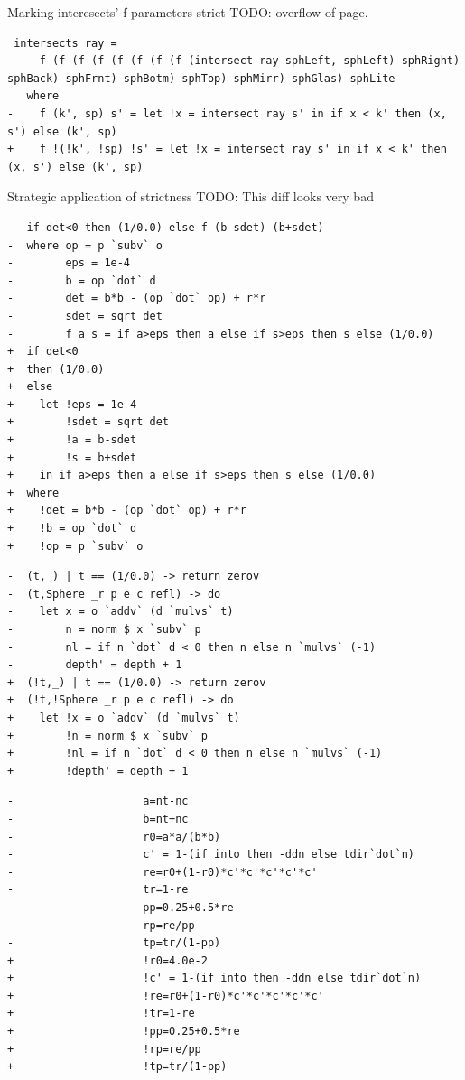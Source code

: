 \documentclass[8pt]{beamer}
\begin{document}
\begin{frame}[fragile]{Marking interesects' f parameters strict}
TODO: overflow of page.
\begin{verbatim}
 intersects ray =
     f (f (f (f (f (f (f (f (intersect ray sphLeft, sphLeft) sphRight) sphBack) sphFrnt) sphBotm) sphTop) sphMirr) sphGlas) sphLite
   where
-    f (k', sp) s' = let !x = intersect ray s' in if x < k' then (x, s') else (k', sp)
+    f !(!k', !sp) !s' = let !x = intersect ray s' in if x < k' then (x, s') else (k', sp)
\end{verbatim}
\end{frame}


\begin{frame}[fragile]{Strategic application of strictness}
TODO: This diff looks very bad
\begin{verbatim}
-  if det<0 then (1/0.0) else f (b-sdet) (b+sdet)
-  where op = p `subv` o
-        eps = 1e-4
-        b = op `dot` d
-        det = b*b - (op `dot` op) + r*r
-        sdet = sqrt det
-        f a s = if a>eps then a else if s>eps then s else (1/0.0)
+  if det<0
+  then (1/0.0)
+  else
+    let !eps = 1e-4
+        !sdet = sqrt det
+        !a = b-sdet
+        !s = b+sdet
+    in if a>eps then a else if s>eps then s else (1/0.0)
+  where
+    !det = b*b - (op `dot` op) + r*r
+    !b = op `dot` d
+    !op = p `subv` o
\end{verbatim}

\begin{verbatim}
-  (t,_) | t == (1/0.0) -> return zerov
-  (t,Sphere _r p e c refl) -> do
-    let x = o `addv` (d `mulvs` t)
-        n = norm $ x `subv` p
-        nl = if n `dot` d < 0 then n else n `mulvs` (-1)
-        depth' = depth + 1
+  (!t,_) | t == (1/0.0) -> return zerov
+  (!t,!Sphere _r p e c refl) -> do
+    let !x = o `addv` (d `mulvs` t)
+        !n = norm $ x `subv` p
+        !nl = if n `dot` d < 0 then n else n `mulvs` (-1)
+        !depth' = depth + 1
\end{verbatim}
\begin{verbatim}
-                    a=nt-nc
-                    b=nt+nc
-                    r0=a*a/(b*b)
-                    c' = 1-(if into then -ddn else tdir`dot`n)
-                    re=r0+(1-r0)*c'*c'*c'*c'*c'
-                    tr=1-re
-                    pp=0.25+0.5*re
-                    rp=re/pp
-                    tp=tr/(1-pp)
+                    !r0=4.0e-2
+                    !c' = 1-(if into then -ddn else tdir`dot`n)
+                    !re=r0+(1-r0)*c'*c'*c'*c'*c'
+                    !tr=1-re
+                    !pp=0.25+0.5*re
+                    !rp=re/pp
+                    !tp=tr/(1-pp)
\end{verbatim}

\end{frame}
\end{document}
